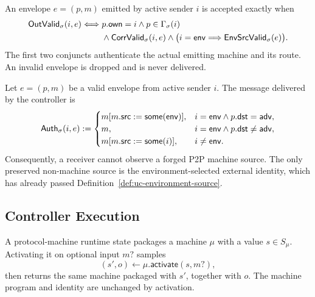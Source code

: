 \begin{definition}
\label{def:uc-outgoing-validity}
\leanok
An envelope \(e=(p,m)\) emitted by active sender \(i\) is accepted exactly when
\[
\begin{aligned}
  \mathsf{OutValid}_\sigma(i,e)
  \Longleftrightarrow{}&
  p.\mathsf{own}=i
  \land p\in\Gamma_\sigma(i)\\
  &\land\mathsf{CorrValid}_\sigma(i,e)
  \land
  \bigl(i=\mathsf{env}\Longrightarrow
    \mathsf{EnvSrcValid}_\sigma(e)\bigr).
\end{aligned}
\]
The first two conjuncts authenticate the actual emitting machine and its route.
An invalid envelope is dropped and is never delivered.
\end{definition}

\begin{definition}
\label{def:uc-authenticated-message}
\leanok
Let \(e=(p,m)\) be a valid envelope from active sender \(i\).  The message
delivered by the controller is
\[
  \mathsf{Auth}_\sigma(i,e):=
  \begin{cases}
    m[m.\mathsf{src}:=\mathsf{some}(\mathsf{env})],
      &i=\mathsf{env}\land p.\mathsf{dst}=\mathsf{adv},\\
    m,
      &i=\mathsf{env}\land p.\mathsf{dst}\ne\mathsf{adv},\\
    m[m.\mathsf{src}:=\mathsf{some}(i)],
      &i\ne\mathsf{env}.
  \end{cases}
\]
Consequently, a receiver cannot observe a forged P2P machine source.  The only
preserved non-machine source is the environment-selected external identity,
which has already passed
Definition~\ref{def:uc-environment-source}.
\end{definition}

\subsection{Controller Execution}

\begin{definition}
\label{def:uc-protocol-runtime-state}
\leanok
A protocol-machine runtime state packages a machine \(\mu\) with a value
\(s\in S_\mu\).  Activating it on optional input \(m?\) samples
\[
  (s',o)\leftarrow
  \mu.\mathsf{activate}(s,m?),
\]
then returns the same machine packaged with \(s'\), together with \(o\).  The
machine program and identity are unchanged by activation.
\end{definition}

